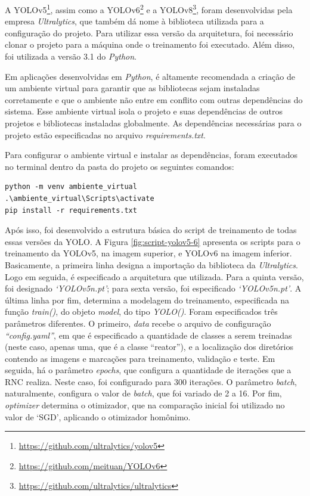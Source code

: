 A YOLOv5\footnote{\url{https://github.com/ultralytics/yolov5}}, assim como a YOLOv6\footnote{\url{https://github.com/meituan/YOLOv6}} e a YOLOv8\footnote{\url{https://github.com/ultralytics/ultralytics}}, foram desenvolvidas pela empresa \textit{Ultralytics}, que também dá nome à biblioteca utilizada para a configuração do projeto. Para utilizar essa versão da arquitetura, foi necessário clonar o projeto para a máquina onde o treinamento foi executado. Além disso, foi utilizada a versão 3.1 do \textit{Python}.

Em aplicações desenvolvidas em \textit{Python}, é altamente recomendada a criação de um ambiente virtual para garantir que as bibliotecas sejam instaladas corretamente e que o ambiente não entre em conflito com outras dependências do sistema. Esse ambiente virtual isola o projeto e suas dependências de outros projetos e bibliotecas instaladas globalmente. As dependências necessárias para o projeto estão especificadas no arquivo \textit{requirements.txt}.

Para configurar o ambiente virtual e instalar as dependências, foram executados no terminal dentro da pasta do projeto os seguintes comandos:

\begin{lstlisting}
python -m venv ambiente_virtual
.\ambiente_virtual\Scripts\activate
pip install -r requirements.txt
\end{lstlisting}

Após isso, foi desenvolvido a estrutura básica do script de treinamento de todas essas versões da YOLO. A Figura \ref{fig:script-yolov5-6} apresenta os scripts para o treinamento da YOLOv5, na imagem superior, e YOLOv6 na imagem inferior. Basicamente, a primeira linha designa a importação da biblioteca da \textit{Ultralytics}. Logo em seguida, é especificado a arquitetura que utilizada. Para a quinta versão, foi designado \textit{‘YOLOv5n.pt’}; para sexta versão, foi especificado \textit{‘YOLOv5n.pt’}. A última linha por fim, determina a modelagem do treinamento, especificada na função \textit{train()}, do objeto \textit{model}, do tipo \textit{YOLO()}. Foram especificados três parâmetros diferentes. O primeiro, \textit{data} recebe o arquivo de configuração \textit{``config.yaml''}, em que é especificado a quantidade de classes a serem treinadas (neste caso, apenas uma, que é a classe ``reator''), e a localização dos diretórios contendo as imagens e marcações para treinamento, validação e teste. Em seguida, há o parâmetro \textit{epochs}, que configura a quantidade de iterações que a RNC realiza. Neste caso, foi configurado para 300 iterações. O parâmetro \textit{batch}, naturalmente, configura o valor de \textit{batch}, que foi variado de 2 a 16. Por fim, \textit{optimizer} determina o otimizador, que na comparação inicial foi utilizado no valor de ‘SGD’, aplicando o otimizador homônimo. 

